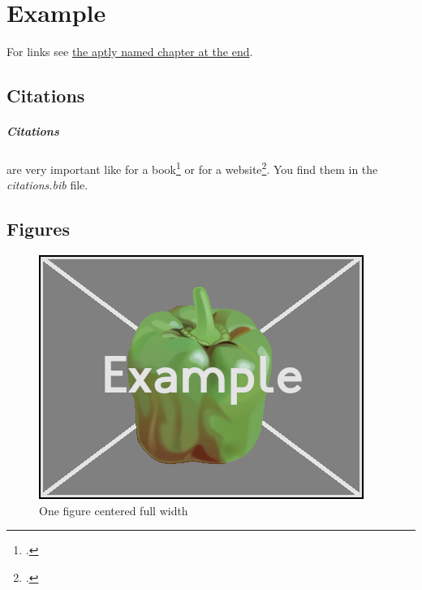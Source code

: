 \section{Example}

For links see \hyperlink{target}{the aptly named chapter at the end}.

\subsection{Citations}
\label{subsec:citations}

\subparagraph{Citations} are very important like for a book\footcite{SJGTHS:1} or for a website\footcite{COADE:1}. You find them in the \emph{citations.bib} file.

\subsection{Figures}

\begin{figure}[H]
	\centering
	\includegraphics[width=\textwidth]{res/example.png}
	\caption[Short caption]{One figure centered full width}
	\label{fig:bigImage}
\end{figure}

